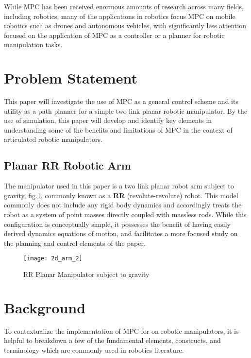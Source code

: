 \documentclass[journal]{IEEEtran}
\begin{document}
While MPC has been received enormous amounts of research across many fields, including  robotics, many of the applications in robotics focus MPC on mobile robotics such as drones and autonomous vehicles, with significantly less attention focused on the application of MPC as a controller or a planner for robotic manipulation tasks.

\section{Problem Statement}

This paper will investigate the use of MPC as a general control scheme and its utility as a path planner for a simple two link planar robotic manipulator. By the use of simulation, this paper will develop and identify key elements in understanding some of the benefits and limitations of MPC in the context of articulated robotic manipulators.

\subsection{Planar RR Robotic Arm}

The manipulator used in this paper is a two link planar robot arm subject to gravity, fig.\ref{RRrobot}, commonly known as a \textbf{RR} (revolute-revolute) robot. This model commonly does not include any rigid body dynamics and accordingly treats the robot as a system of point masses directly coupled with massless rods. While this configuration is conceptually simple, it possesses the benefit of having easily derived dynamics equations of motion, and facilitates a more focused study on the planning and control elements of the paper. \\

\begin{figure}
    \centering
    \texttt{[image: 2d\_arm\_2]}
    \caption{RR Planar Manipulator subject to gravity}
    \label{RRrobot}
\end{figure}

\section{Background}

To contextualize the implementation of MPC for on robotic manipulators, it is helpful to breakdown a few of the fundamental elements, constructs, and terminology which are commonly used in robotics literature.
\end{document}
